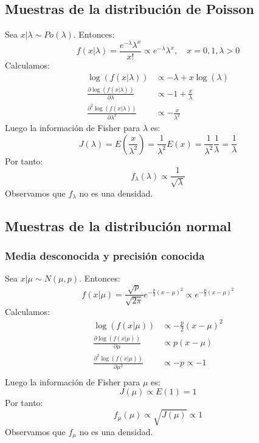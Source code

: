 \subsection*{Muestras de la distribución de Poisson}
Sea $x|\lambda \sim Po(\lambda)$.
Entonces:
$$f(x|\lambda) = \frac{e^{-\lambda}\lambda^x}{x!} \propto e^{-\lambda}\lambda^x, \quad x = 0, 1, \lambda > 0$$
Calculamos:
\begin{align*}
    \log(f(x|\lambda))                                       & \propto -\lambda + x\log(\lambda) \\
    \frac{\partial \log(f(x|\lambda))}{\partial \lambda}     & \propto -1 + \frac{x}{\lambda}    \\
    \frac{\partial^2 \log(f(x|\lambda))}{\partial \lambda^2} & \propto -\frac{x}{\lambda^2}
\end{align*}
Luego la información de Fisher para $\lambda$ es:
$$J(\lambda) = E\left(\frac{x}{\lambda^2}\right) = \frac{1}{\lambda^2}E(x) = \frac{1}{\lambda^2}\frac{1}{\lambda} = \frac{1}{\lambda}$$
Por tanto:
$$f_\lambda(\lambda) \propto \frac{1}{\sqrt{\lambda}}$$
Observamos que $f_\lambda$ no es una densidad.

\subsection*{Muestras de la distribución normal}
\subsubsection*{Media desconocida y precisión conocida}
Sea $x|\mu \sim N(\mu, p)$.
Entonces:
$$f(x|\mu) = \frac{\sqrt{p}}{\sqrt{2\pi}}e^{-\frac{p}{2}(x-\mu)^2} \propto e^{-\frac{p}{2}(x-\mu)^2}$$
Calculamos:
\begin{align*}
    \log(f(x|\mu))                                   & \propto -\frac{p}{2}(x-\mu)^2 \\
    \frac{\partial \log(f(x|\mu))}{\partial \mu}     & \propto p(x-\mu)              \\
    \frac{\partial^2 \log(f(x|\mu))}{\partial \mu^2} & \propto -p \propto -1         \\
\end{align*}
Luego la información de Fisher para $\mu$ es:
$$J(\mu) \propto E(1) = 1$$
Por tanto:
$$f_\mu(\mu) \propto \sqrt{J(\mu)} \propto 1$$
Observamos que $f_\mu$ no es una densidad.

